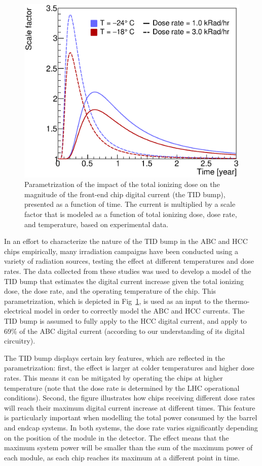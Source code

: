 \begin{figure}[ht]
\centering
\includegraphics[width=0.45\linewidth]{figures/AbcTidBumpVersionRatesAndTemps_Nominal.eps}
\caption{Parametrization of the impact of the total ionizing dose
on the magnitude of the front-end chip digital current (the TID bump), presented as a function of time.
The current is multiplied by a scale factor that is modeled as a function of total ionizing dose,
dose rate, and temperature, based on experimental data.
}
\label{tid_bump}
\end{figure}

In an effort to characterize the nature of the TID bump in the ABC and HCC chips empirically,
many irradiation campaigns have been conducted using a variety of radiation sources, testing
the effect at different temperatures and dose rates.
The data collected from these studies was used to develop a model of the TID bump
that estimates the digital current increase given the total ionizing dose, the dose rate,
and the operating temperature of the chip. This parametrization, which is depicted in
Fig~\ref{tid_bump}, is used as an input to the thermo-electrical model in order to correctly model the
ABC and HCC currents. The TID bump is assumed to fully apply to the HCC digital current, and apply to
69\% of the ABC digital current (according to our understanding of its digital circuitry).

The TID bump displays certain key features, which are reflected in the parametrization:
first, the effect is larger at colder temperatures and higher dose rates. This means it can be
mitigated by operating the chips at higher temperature (note that the dose rate is determined by the LHC operational conditions).
Second, the figure illustrates how chips receiving different dose rates will reach their maximum
digital current increase at different times. This feature is particularly important when modelling the
total power consumed by the barrel and endcap systems. In both systems, the dose rate varies significantly
depending on the position of the module in the detector. The effect means that the maximum system
power will be smaller than the sum of the maximum power of each module, as each chip reaches
its maximum at a different point in time.

